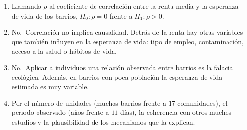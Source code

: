 \documentclass[
  spanish,
  a4paper,
]{scrreport}
\theoremstyle{definition}
\theoremstyle{remark}
\begin{document}
\begin{tcolorbox}[enhanced jigsaw, arc=.35mm, bottomrule=.15mm, bottomtitle=1mm, breakable, colback=white, colbacktitle=quarto-callout-tip-color!10!white, colframe=quarto-callout-tip-color-frame, coltitle=black, left=2mm, leftrule=.75mm, opacityback=0, opacitybacktitle=0.6, rightrule=.15mm, title=\textcolor{quarto-callout-tip-color}{\faLightbulb}\hspace{0.5em}{Solución}, titlerule=0mm, toprule=.15mm, toptitle=1mm]

\begin{enumerate}
\def\labelenumi{\alph{enumi}.}
\item
  Llamando \(\rho\) al coeficiente de correlación entre la renta media y
  la esperanza de vida de los barrios, \(H_0: \rho=0\) frente a
  \(H_1: \rho>0\).
\item
  No.~Correlación no implica causalidad. Detrás de la renta hay otras
  variables que también influyen en la esperanza de vida: tipo de
  empleo, contaminación, acceso a la salud o hábitos de vida.
\item
  No.~Aplicar a individuos una relación observada entre barrios es la
  falacia ecológica. Además, en barrios con poca población la esperanza
  de vida estimada es muy variable.
\item
  Por el número de unidades (muchos barrios frente a \(17\)
  comunidades), el periodo observado (años frente a \(11\) días), la
  coherencia con otros muchos estudios y la plausibilidad de los
  mecanismos que la explican.
\end{enumerate}

\end{tcolorbox}
\end{document}
